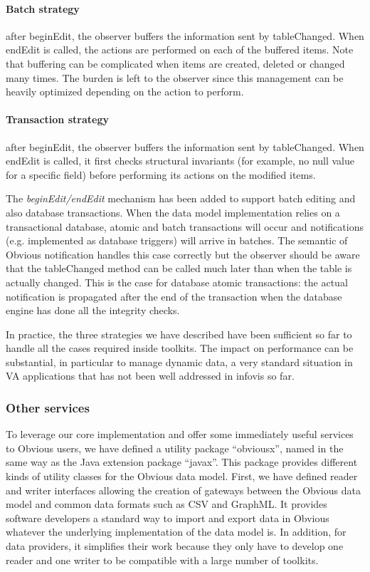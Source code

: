 \paragraph{Batch strategy} after beginEdit, the observer buffers the
  information sent by tableChanged.  When endEdit is called, the
  actions are performed on each of the buffered items.  Note that 
  buffering can be complicated when items are created, deleted or
  changed many times.  The burden is left to the observer since this
  management can be heavily optimized depending on the action to
  perform.

\paragraph{Transaction strategy} after beginEdit, the observer buffers the
  information sent by tableChanged.  When endEdit is called, it first
  checks structural invariants (for example, no null value for a
  specific field) before performing its actions on the modified items.

The \emph{beginEdit/endEdit} mechanism has been added to support batch
editing and also database transactions.  When the data model
implementation relies on a transactional database, atomic and batch
transactions will occur and notifications (e.g. implemented as
database triggers) will arrive in batches.  The semantic of Obvious
notification handles this case correctly but the observer should be
aware that the tableChanged method can be called much later than when
the table is actually changed.  This is the case for database atomic
transactions: the actual notification is propagated after the end of
the transaction when the database engine has done all the integrity
checks.

In practice, the three strategies we have described have been
sufficient so far to handle all the cases required inside toolkits.
The impact on performance can be substantial, in particular to manage
dynamic data, a very standard situation in VA
applications that has not been well addressed in infovis so far.


\subsubsection{Other services}

To leverage our core implementation and offer some immediately useful
services to Obvious users, we have defined a utility package
``obviousx'', named in the same way as the Java extension package
``javax''.  This package provides different kinds of utility classes
for the Obvious data model.  First, we have defined reader and writer
interfaces allowing the creation of gateways between the Obvious data
model and common data formats such as CSV and GraphML.  It provides
software developers a standard way to import and export data in
Obvious whatever the underlying implementation of the data model
is.  In addition, for data providers, it simplifies their work because
they only have to develop one reader and one writer to be compatible
with a large number of toolkits.

